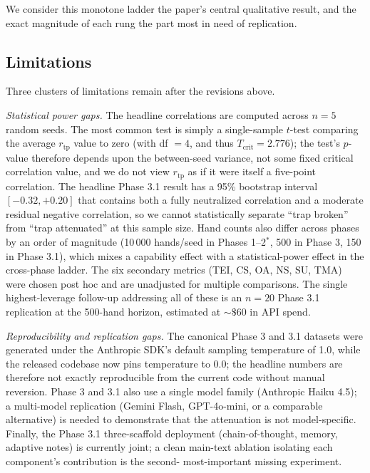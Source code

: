 \documentclass[10pt]{article} %
\newcommand{\rtp}{\ensuremath{r_{\mathrm{tp}}}}
\begin{document}
We consider this monotone ladder the paper's central qualitative result, and
the exact magnitude of each rung the part most in need of replication.

\subsection{Limitations}
Three clusters of limitations remain after the revisions above.

\textit{Statistical power gaps.} The headline correlations are
computed across $n = 5$ random seeds. The most common test is simply
a single-sample $t$-test comparing the average $\rtp$ value to zero
(with df $= 4$, and thus $T_{\text{crit}} = 2.776$); the test's
$p$-value therefore depends upon the between-seed variance, not some
fixed critical correlation value, and we do not view $\rtp$ as if it
were itself a five-point correlation. The headline
Phase 3.1 result has a 95\% bootstrap interval $[-0.32, +0.20]$
that contains both a fully neutralized correlation and a
moderate residual negative correlation, so we cannot
statistically separate ``trap broken'' from ``trap attenuated''
at this sample size. Hand counts also differ across phases by an
order of magnitude (10\,000 hands/seed in Phases 1--2$^{*}$, 500
in Phase 3, 150 in Phase 3.1), which mixes a capability effect
with a statistical-power effect in the cross-phase ladder. The
six secondary metrics (TEI, CS, OA, NS, SU, TMA) were chosen
post hoc and are unadjusted for multiple comparisons. The single
highest-leverage follow-up addressing all of these is an $n = 20$
Phase 3.1 replication at the 500-hand horizon, estimated at
${\sim}\$60$ in API spend.

\textit{Reproducibility and replication gaps.} The canonical
Phase 3 and 3.1 datasets were generated under the Anthropic SDK's
default sampling temperature of 1.0, while the released codebase
now pins temperature to 0.0; the headline numbers are therefore
not exactly reproducible from the current code without manual
reversion. Phase 3 and 3.1 also use a single model family
(Anthropic Haiku 4.5); a multi-model replication (Gemini Flash,
GPT-4o-mini, or a comparable alternative) is needed to
demonstrate that the attenuation is not model-specific. Finally,
the Phase 3.1 three-scaffold deployment (chain-of-thought,
memory, adaptive notes) is currently joint; a clean main-text
ablation isolating each component's contribution is the second-
most-important missing experiment.
\end{document}
